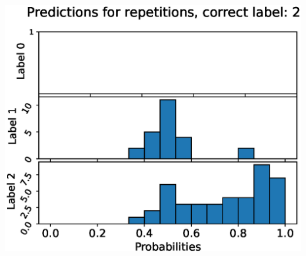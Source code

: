 \begin{center}
\begin{minipage}{0.33\textwidth}
  \includegraphics[width=\textwidth]{files/figs/app/hists/trunk/pr2.eps}
\end{minipage}


\end{center}
